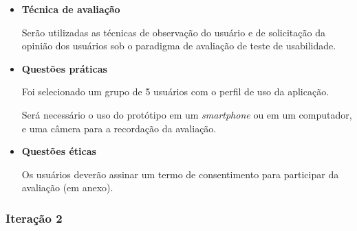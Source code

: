 \begin{itemize}
	   \item \textbf{Técnica de avaliação}
	      
	      \subitem 
		Serão utilizadas as técnicas de observação do usuário e de solicitação da opinião dos usuários
		sob o paradigma de avaliação de teste de usabilidade.
	      
	   \item \textbf{Questões práticas}
	      
	      \subitem Foi selecionado um grupo de 5 usuários com o perfil de uso da aplicação.
	      
	      \subitem Será necessário o uso do protótipo em um \textit{smartphone} ou em um computador, e uma câmera para 
	      a recordação da avaliação.
	      
	   \item \textbf{Questões éticas}
	      
	      \subitem 
		Os usuários deverão assinar um termo de consentimento para participar da avaliação (em anexo).
	      
	  \end{itemize}
	  
      \subsubsection{Iteração 2}
	
